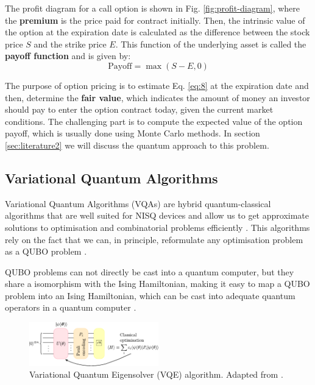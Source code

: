 \documentclass[prx,twocolumn,floatfix,superscriptaddress,longbibliography]{revtex4-1}
\begin{document}
The profit diagram for a call option is shown in Fig. \ref{fig:profit-diagram}, where the \textbf{premium} is the price paid for contract initially. Then, the 
intrinsic value of the option at the expiration date is calculated as the difference between the stock price $S$ and the strike price $E$. 
This function of the underlying asset is called the \textbf{payoff function} and is given by:
\begin{equation}
  \label{eq:8}
  \text{Payoff} = \max(S - E, 0)
\end{equation}

The purpose of option pricing is to estimate Eq. \ref{eq:8} at the expiration date and then, determine the \textbf{fair value}, which indicates the amount of money an 
investor should pay to enter the option contract today, given the current market conditions. 
The challenging part is to compute the expected value of the option payoff, which is usually done using Monte Carlo methods. In section \ref{sec:literature2} we will discuss the quantum approach to 
this problem.

\subsection{Variational Quantum Algorithms}
Variational Quantum Algorithms (VQAs) are hybrid quantum-classical algorithms that 
are well suited for NISQ devices and allow us to get approximate solutions to optimisation and combinatorial problems efficiently \cite{Cerezo2021}. This algorithms rely on the fact that we can, in 
principle, reformulate any optimisation problem as a QUBO problem \cite{Glover2019}.  

QUBO problems can not directly be cast into a quantum computer, but they share a isomorphism with the Ising Hamiltonian, making it easy to map a QUBO problem into an Ising Hamiltonian, which can be cast into adequate quantum operators in a quantum computer \cite{Buonaiuto2023}. 
\begin{figure}[h!]
\centering 
\includegraphics[width=0.5\textwidth]{VQE-Buonaiuto.pdf}
  \caption{\label{fig:vqe} Variational Quantum Eigensolver (VQE) algorithm. Adapted from \cite{Buonaiuto2023}.}
\end{figure}
\end{document}
